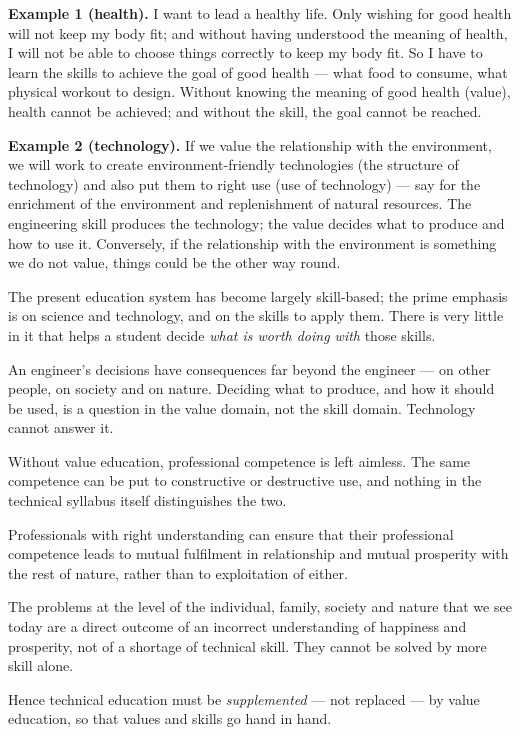 \textbf{Example 1 (health).} I want to lead a healthy life. Only wishing for
good health will not keep my body fit; and without having understood the
meaning of health, I will not be able to choose things correctly to keep my
body fit. So I have to learn the skills to achieve the goal of good health ---
what food to consume, what physical workout to design. Without knowing the
meaning of good health (value), health cannot be achieved; and without the
skill, the goal cannot be reached.

\textbf{Example 2 (technology).} If we value the relationship with the
environment, we will work to create environment-friendly technologies (the
structure of technology) and also put them to right use (use of technology)
--- say for the enrichment of the environment and replenishment of natural
resources. The engineering skill produces the technology; the value decides
what to produce and how to use it. Conversely, if the relationship with the
environment is something we do not value, things could be the other way round.


\ans The present education system has become largely skill-based; the prime
emphasis is on science and technology, and on the skills to apply them. There
is very little in it that helps a student decide \emph{what is worth doing
with} those skills.

\begin{abul}
\item An engineer's decisions have consequences far beyond the engineer ---
      on other people, on society and on nature. Deciding what to produce,
      and how it should be used, is a question in the value domain, not the
      skill domain. Technology cannot answer it.
\item Without value education, professional competence is left aimless. The
      same competence can be put to constructive or destructive use, and
      nothing in the technical syllabus itself distinguishes the two.
\item Professionals with right understanding can ensure that their
      professional competence leads to mutual fulfilment in relationship and
      mutual prosperity with the rest of nature, rather than to exploitation
      of either.
\item The problems at the level of the individual, family, society and nature
      that we see today are a direct outcome of an incorrect understanding of
      happiness and prosperity, not of a shortage of technical skill. They
      cannot be solved by more skill alone.
\item Hence technical education must be \emph{supplemented} --- not replaced
      --- by value education, so that values and skills go hand in hand.
\end{abul}

